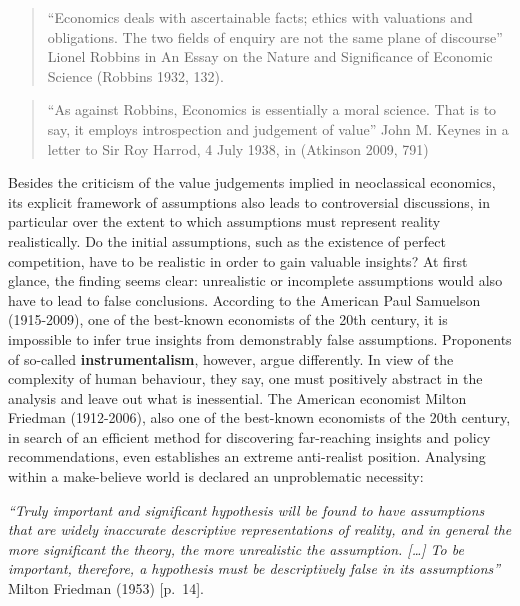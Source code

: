 \documentclass[
  british,
  a4paper,
  DIV=11,
  numbers=noendperiod,
  oneside,
  openany]{scrreprt}
\begin{document}
\begin{quote}
``Economics deals with ascertainable facts; ethics with valuations and
obligations. The two fields of enquiry are not the same plane of
discourse'' Lionel Robbins in An Essay on the Nature and Significance of
Economic Science (Robbins 1932, 132).
\end{quote}

\begin{quote}
``As against Robbins, Economics is essentially a moral science. That is
to say, it employs introspection and judgement of value'' John M. Keynes
in a letter to Sir Roy Harrod, 4 July 1938, in (Atkinson 2009, 791)
\end{quote}

\begin{tcolorbox}[enhanced jigsaw, arc=.35mm, bottomrule=.15mm, bottomtitle=1mm, breakable, colback=white, colbacktitle=quarto-callout-tip-color!10!white, colframe=quarto-callout-tip-color-frame, coltitle=black, left=2mm, leftrule=.75mm, opacityback=0, opacitybacktitle=0.6, rightrule=.15mm, title={Excursus: Do assumptions have to be realistic?}, titlerule=0mm, toprule=.15mm, toptitle=1mm]

Besides the criticism of the value judgements implied in neoclassical
economics, its explicit framework of assumptions also leads to
controversial discussions, in particular over the extent to which
assumptions must represent reality realistically. Do the initial
assumptions, such as the existence of perfect competition, have to be
realistic in order to gain valuable insights? At first glance, the
finding seems clear: unrealistic or incomplete assumptions would also
have to lead to false conclusions. According to the American Paul
Samuelson (1915-2009), one of the best-known economists of the 20th
century, it is impossible to infer true insights from demonstrably false
assumptions. Proponents of so-called \textbf{instrumentalism}, however,
argue differently. In view of the complexity of human behaviour, they
say, one must positively abstract in the analysis and leave out what is
inessential. The American economist Milton Friedman (1912-2006), also
one of the best-known economists of the 20th century, in search of an
efficient method for discovering far-reaching insights and policy
recommendations, even establishes an extreme anti-realist position.
Analysing within a make-believe world is declared an unproblematic
necessity:

\emph{``Truly important and significant hypothesis will be found to have
assumptions that are widely inaccurate descriptive representations of
reality, and in general the more significant the theory, the more
unrealistic the assumption. {[}\ldots{]} To be important, therefore, a
hypothesis must be descriptively false in its assumptions''} Milton
Friedman (1953) {[}p.~14{]}.

\end{tcolorbox}
\end{document}
